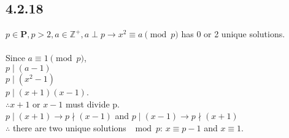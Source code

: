 \documentclass{article}
\begin{document}
\newpage
\subsection{4.2.18}
$p \in \textbf{P}, p>2, a \in \mathbb{Z^+}, a \perp p \rightarrow x^2 \equiv a \pmod{p}$ has 0 or 2 unique solutions.
\\
\\Since $a \equiv 1 \pmod{p}$,
\\$p \mid (a - 1)$
\\$p \mid (x^2 - 1)$
\\$p \mid (x+1)(x-1)$.
\\$\therefore x+1$ or $x-1$ must divide p.
\\$p \mid (x+1) \rightarrow p \nmid (x-1)$ and $p \mid (x-1) \rightarrow p \nmid (x+1)$
\\$\therefore$ there are two unique solutions $\mod p$: $x \equiv p-1$ and $x \equiv 1$.
\end{document}
